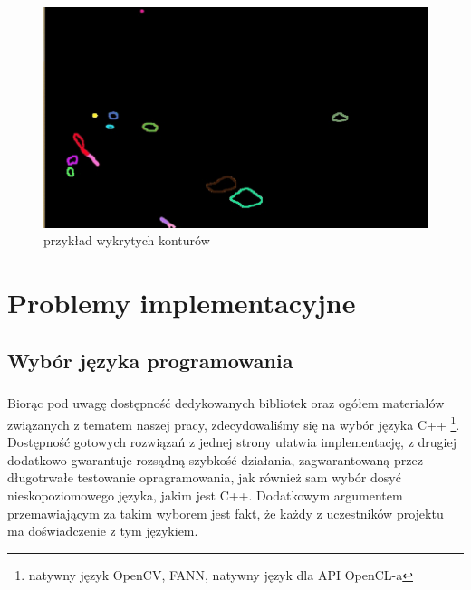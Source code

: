 \documentclass{article}
\begin{document}
\begin{enumerate}
\begin{figure}[H]
\begin{center}
\includegraphics[scale=0.3]{kontury.png} 
\end{center}
\caption{przykład wykrytych konturów}
\label{fig:contours}
\end{figure}

\end{enumerate}

\newpage
\section{Problemy implementacyjne}
\subsection{Wybór języka programowania}
\subparagraph{} Biorąc pod uwagę dostępność dedykowanych bibliotek oraz ogółem materiałów związanych z tematem naszej pracy, zdecydowaliśmy się na wybór języka C++ \footnote{natywny język OpenCV, FANN, natywny język dla API OpenCL-a}. Dostępność gotowych rozwiązań z jednej strony ułatwia implementację, z drugiej dodatkowo gwarantuje rozsądną szybkość działania, zagwarantowaną przez długotrwałe testowanie opragramowania, jak również sam wybór dosyć nieskopoziomowego języka, jakim jest C++. Dodatkowym argumentem przemawiającym za takim wyborem jest fakt, że każdy z uczestników projektu ma doświadczenie z tym językiem.
\end{document}
